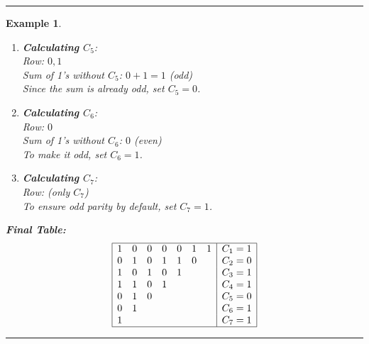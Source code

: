 \documentclass[12pt]{article}
\newtheorem{example}{Example}
\newenvironment{examp}
{\vspace{0.5cm}
 \hrule
\vspace{0.5cm}
\begin{example}}
{\hrule
\vspace{0.5cm}
\end{example}}
\begin{document}
\begin{examp}
\begin{enumerate}
		\item \textbf{Calculating \( C_5 \)}: \\
		      Row: \( 0, 1 \) \\
		      Sum of 1's without \( C_5 \): \( 0 + 1 = 1 \) (odd) \\
		      Since the sum is already odd, set \( C_5 = 0 \).

		\item \textbf{Calculating \( C_6 \)}: \\
		      Row: \( 0 \) \\
		      Sum of 1's without \( C_6 \): \( 0 \) (even) \\
		      To make it odd, set \( C_6 = 1 \).

		\item \textbf{Calculating \( C_7 \)}: \\
		      Row: (only \( C_7 \)) \\
		      To ensure odd parity by default, set \( C_7 = 1 \).
	\end{enumerate}
	\textbf{Final Table:}
	\[
		\begin{array}{|ccccccc|c|}
			\hline
			1 & 0 & 0 & 0 & 0 & 1 & 1 & C_1 = 1 \\
			0 & 1 & 0 & 1 & 1 & 0 &   & C_2 = 0 \\
			1 & 0 & 1 & 0 & 1 &   &   & C_3 = 1 \\
			1 & 1 & 0 & 1 &   &   &   & C_4 = 1 \\
			0 & 1 & 0 &   &   &   &   & C_5 = 0 \\
			0 & 1 &   &   &   &   &   & C_6 = 1 \\
			1 &   &   &   &   &   &   & C_7 = 1 \\
			\hline
		\end{array}
	\]
\end{examp}
\end{document}
